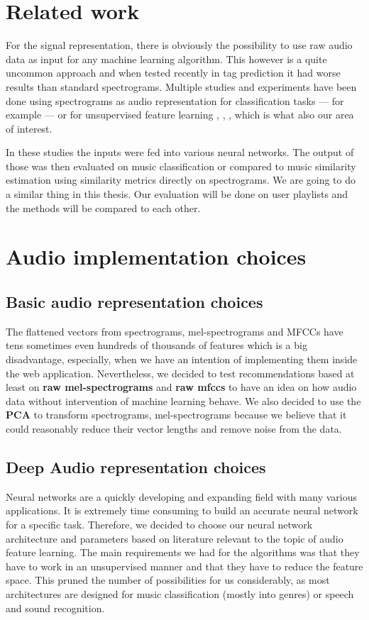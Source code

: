 \section{Related work}\label{sec:audio_related_work}
For the signal representation, there is obviously the possibility to use raw audio data as input for any machine learning algorithm. This however is a quite uncommon approach and when tested recently in tag prediction \cite{6854950} it had worse results than standard spectrograms. Multiple studies and experiments have been done using spectrograms as audio representation for classification tasks --- for example \cite{wang2014improving} --- or for unsupervised feature learning \cite{van2013deep}, \cite{Ramakrishnan2017song2V}, \cite{NIPS2009_3674}, which is what also our area of interest. 

In these studies the inputs were fed into various neural networks. The output of those was then evaluated on music classification or compared to music similarity estimation using similarity metrics directly on spectrograms. We are going to do a similar thing in this thesis. Our evaluation will be done on user playlists and the methods will be compared to each other.

\section{Audio implementation choices}

\subsection{Basic audio representation choices}
The flattened vectors from spectrograms, mel-spectrograms and MFCCs have tens sometimes even hundreds of thousands of features which is a big disadvantage, especially, when we have an intention of implementing them inside the web application. Nevertheless, we decided to test recommendations based at least on \textbf{raw mel-spectrograms} and \textbf{raw mfccs} to have an idea on how audio data without intervention of machine learning behave. We also decided to use the \textbf{PCA} to transform spectrograms, mel-spectrograms because we believe that it could reasonably reduce their vector lengths and remove noise from the data.


\subsection{Deep Audio representation choices}
Neural networks are a quickly developing and expanding field with many various applications. It is extremely time consuming to build an accurate neural network for a specific task. Therefore, we decided to choose our neural network architecture and parameters based on literature relevant to the topic of audio feature learning. The main requirements we had for the algorithms was that they have to work in an unsupervised manner and that they have to reduce the feature space. This pruned the number of possibilities for us considerably, as most architectures are designed for music classification (mostly into genres) or speech and sound recognition. 


